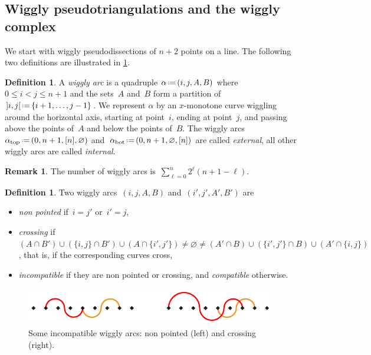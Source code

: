 \documentclass{amsart}
\theoremstyle{definition}
\newtheorem{definition}[theorem]{Definition}
\newtheorem{remark}[theorem]{Remark}
\newcommand{\eqdef}{\mbox{\,\raisebox{0.2ex}{\scriptsize\ensuremath{\mathrm:}}\ensuremath{=}\,}} %
\newcommand{\darkblue}{\color{darkblue}} %
\newcommand{\defn}[1]{\textsl{\darkblue #1}} %
\begin{document}

\subsection{Wiggly pseudotriangulations and the wiggly complex}
\label{subsec:wigglyPseudotriangulations}

We start with wiggly pseudodissections of $n+2$ points on a line.
The following two definitions are illustrated in \cref{fig:incompatible}.

\begin{definition}
A \defn{wiggly arc} is a quadruple $\alpha \eqdef (i,j,A,B)$ where $0 \le i < j \le n+1$ and the sets~$A$ and~$B$ form a partition of~${]i,j[} \eqdef \{i+1, \dots, j-1\}$.
We represent $\alpha$ by an $x$-monotone curve wiggling around the horizontal axis, starting at point~$i$, ending at point~$j$, and passing above the points of~$A$ and below the points of~$B$.
The wiggly arcs~$\alpha_\mathrm{top} \eqdef (0, n+1, [n], \varnothing)$ and~$\alpha_\mathrm{bot} \eqdef (0, n+1, \varnothing, [n])$ are called \defn{external}, all other wiggly arcs are called \defn{internal}.
\end{definition}

\begin{remark}
\label{rem:numberWigglyArcs}
The number of wiggly arcs is~$\sum_{\ell = 0}^n 2^\ell (n+1-\ell)$.
\end{remark}

\begin{definition}
\label{def:compatible}
Two wiggly arcs~$(i,j,A,B)$ and~$(i',j',A',B')$ are 
\begin{itemize}
\item \defn{non pointed} if~$i = j'$ or~$i' = j$,
\item \defn{crossing} if~$(A \cap B') \cup (\{i,j\} \cap B') \cup (A \cap \{i',j'\}) \ne \varnothing \ne (A' \cap B) \cup (\{i',j'\} \cap B) \cup (A' \cap \{i,j\})$, that is, if the corresponding curves cross,
\item \defn{incompatible} if they are non pointed or crossing, and \defn{compatible} otherwise.
\end{itemize}
%
\begin{figure}[b]
\centerline{\includegraphics[scale=1.3]{incompatible}}
\caption{Some incompatible wiggly arcs: non pointed (left) and crossing (right).}
\label{fig:incompatible}
\end{figure}
\end{definition}
\end{document}

